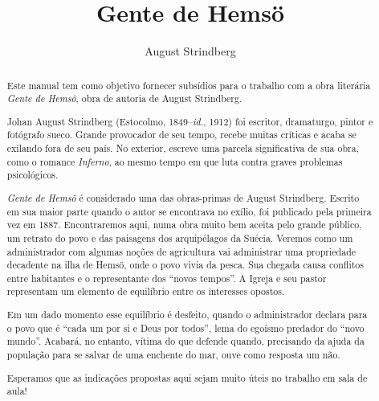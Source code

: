 \documentclass[12pt]{extarticle}
\begin{document}

\newcommand{\AutorLivro}{August Strindberg}
\newcommand{\TituloLivro}{Gente de Hemsö}
\newcommand{\Tema}{Ficção, mistério e fantasia}
\newcommand{\Genero}{Romance}
\newcommand{\imagemCapa}{./images/PNLD0039-01.png}
\newcommand{\issnppub}{---}
\newcommand{\issnepub}{---}
\newcommand{\colaborador}{Bruno Gradella e Vicente Castro} 


\title{\TituloLivro}
\author{\AutorLivro}
\def\authornotes{\colaborador}

\date{}
\maketitle

\baselineskip\par

\begin{abstract}
Este manual tem como objetivo fornecer subsídios para o trabalho com a
obra literária \emph{Gente de Hemsö}, obra de autoria de August
Strindberg.

Johan August Strindberg (Estocolmo, 1849--\textit{id.}, 1912) 
foi escritor, dramaturgo, pintor e fotógrafo sueco. Grande provocador
de seu tempo, recebe muitas críticas e acaba se exilando fora de 
seu país. No exterior, escreve uma parcela significativa de sua obra,
como o romance \textit{Inferno}, ao mesmo tempo em que luta contra graves 
problemas psicológicos.

\textit{Gente de Hemsö} é considerado uma das obras-primas de August 
Strindberg. Escrito em sua maior parte quando o autor se encontrava no 
exílio, foi publicado pela primeira vez em 1887. Encontraremos aqui, 
numa obra muito bem aceita pelo grande público, um retrato do povo e das 
paisagens dos arquipélagos da Suécia. Veremos como um administrador com 
algumas noções de agricultura vai administrar uma propriedade decadente 
na ilha de Hemsö, onde o povo vivia da pesca. Sua chegada causa 
conflitos entre habitantes e o representante dos ``novos tempos''. A Igreja 
e seu pastor representam um elemento de equilíbrio entre os interesses 
opostos.

Em um dado momento esse equilíbrio é desfeito, quando o administrador 
declara para o povo que é ``cada um por si e Deus por todos'', lema do 
egoísmo predador do ``novo mundo''. Acabará, no entanto, vítima do que 
defende quando, precisando da ajuda da população para se salvar de uma 
enchente do mar, ouve como resposta um não.

Esperamos que as indicações propostas aqui sejam muito úteis no trabalho 
em sala de aula! 
\end{abstract}
\pagebreak
\end{document}
